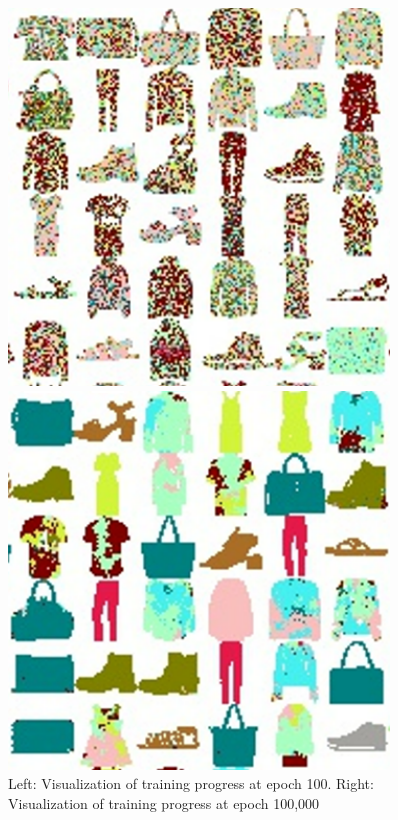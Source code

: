 \documentclass[conference]{IEEEtran}
\begin{document}
\begin{figure}
    \centering
    \begin{minipage}{0.24\textwidth}
        \centering
        \includegraphics[width=0.9\textwidth]{resources/ep100_class.png} %
    \end{minipage}\hfill
    \begin{minipage}{0.24\textwidth}
        \centering
        \includegraphics[width=0.9\textwidth]{resources/ep100000_class.png} %
    \end{minipage}
    \caption{Left: Visualization of training progress at epoch 100. Right: Visualization of training progress at epoch 100,000}
    \label{fig:fig}
\end{figure}
\end{document}
